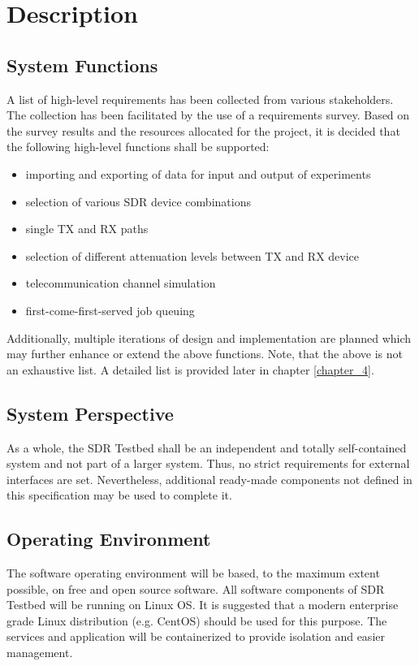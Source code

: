\documentclass[english,titlepage,a4paper]{report}
\begin{document}
\chapter{Description}
\section{System Functions}

A list of high-level requirements has been collected from various stakeholders.
The collection has been facilitated by the use of a requirements survey.
Based on the survey results and the resources allocated for the project, it is decided that the following high-level functions shall be supported:
\begin{itemize}
\item importing and exporting of data for input and output of experiments
\item selection of various SDR device combinations
\item single TX and RX paths
\item selection of different attenuation levels between TX and RX device
\item telecommunication channel simulation
\item first-come-first-served job queuing
\end{itemize}

Additionally, multiple iterations of design and implementation are planned which may further enhance or extend the above functions.
Note, that the above is not an exhaustive list.
A detailed list is provided later in chapter \ref{chapter_4}.

\section{System Perspective}

As a whole, the SDR Testbed shall be an independent and totally self-contained system and not part of a larger system.
Thus, no strict requirements for external interfaces are set.
Nevertheless, additional ready-made components not defined in this specification may be used to complete it.

\section{Operating Environment}

The software operating environment will be based, to the maximum extent possible, on free and open source software.
All software components of SDR Testbed will be running on Linux OS.
It is suggested that a modern enterprise grade Linux distribution (e.g. CentOS) should be used for this purpose.
The services and application will be containerized to provide isolation and easier management.
\end{document}
